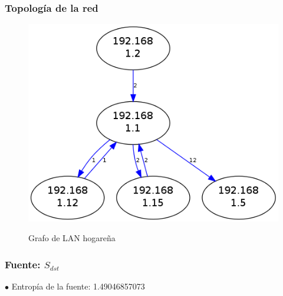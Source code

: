 \documentclass[10pt, a4paper]{article}
\begin{document}
\subsubsection{Topología de la red}

\begin{figure}[H]
  \begin{center}
    \includegraphics[width=\linewidth/2]{../imgs/pruebaFede-ips_red.png}
    \label{fig:FedeGrafo}
    \caption{Grafo de LAN hogareña}
  \end{center}
\end{figure}

\subsubsection{Fuente: $S_{dst}$}

$\bullet$ Entropía de la fuente: 1.49046857073
\end{document}
